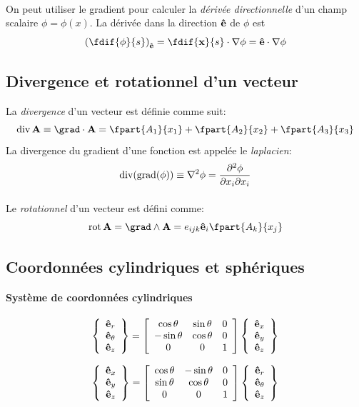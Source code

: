 \paragraph{}
On peut utiliser le gradient pour calculer la \emph{dérivée directionnelle} d'un champ scalaire $\phi=\phi(x)$.
La dérivée dans la direction $\textbf{ê}$ de $\phi$ est $$\left(\fdif{\phi}{s}\right)_{\fv{ê}}=\fdif{\fv{x}}{s}\cdot\nabla\phi=\fv{ê}\cdot\nabla\phi$$

\subsection{Divergence et rotationnel d'un vecteur}
La \emph{divergence} d'un vecteur est définie comme suit:
\[ \mydiv\fv{A} \equiv \div \fv{A}=\fpart{A_1}{x_1}+\fpart{A_2}{x_2}+\fpart{A_3}{x_3} \]
La divergence du gradient d'une fonction est appelée le \emph{laplacien}: $$\operatorname{div}(\operatorname{grad}(\phi))\equiv \nabla^2\phi=\frac{\partial^2\phi}{\partial x_i\partial x_i}$$
\paragraph{}
Le \emph{rotationnel} d'un vecteur est défini comme:
$$\myrot\fv{A}=\rot \fv{A}=e_{ijk}\fv{ê}_i\fpart{A_k}{x_j}$$

\subsection{Coordonnées cylindriques et sphériques}
\paragraph{Système de coordonnées cylindriques}
$$\left\{\begin{array}{c}
\textbf{ê}_r\\
\textbf{ê}_{\theta}\\
\textbf{ê}_z
\end{array}\right\}=
\left[\begin{array}{ccc}
\cos\theta&\sin\theta&0\\
-\sin\theta&\cos\theta&0\\
0&0&1
\end{array}\right]
\left\{\begin{array}{c}
\textbf{ê}_x\\
\textbf{ê}_y\\
\textbf{ê}_z
\end{array}\right\}$$

$$\left\{\begin{array}{c}
\textbf{ê}_x\\
\textbf{ê}_{y}\\
\textbf{ê}_z
\end{array}\right\}=
\left[\begin{array}{ccc}
\cos\theta&-\sin\theta&0\\
\sin\theta&\cos\theta&0\\
0&0&1
\end{array}\right]
\left\{\begin{array}{c}
\textbf{ê}_r\\
\textbf{ê}_{\theta}\\
\textbf{ê}_z
\end{array}\right\}$$

